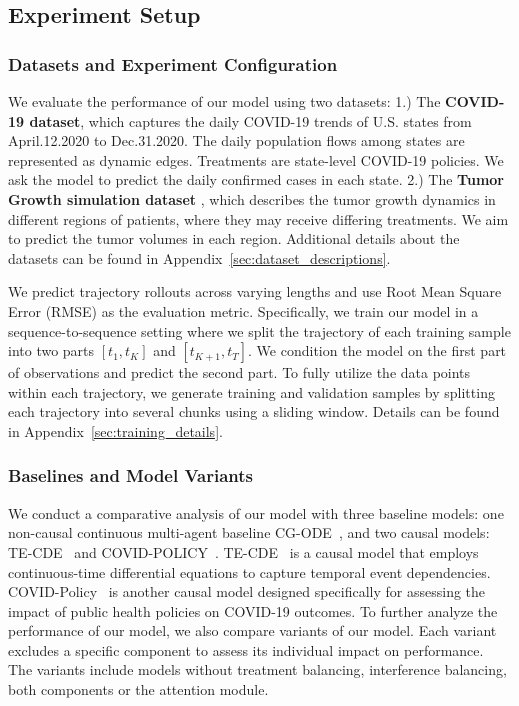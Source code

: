 \subsection{Experiment Setup}
\subsubsection{Datasets and Experiment Configuration} 

We evaluate the performance of our model using two datasets: 1.) The {\bf COVID-19 dataset}, which captures the daily COVID-19 trends of  U.S. states from April.12.2020 to Dec.31.2020. The daily population flows among states are represented as dynamic edges. Treatments are state-level COVID-19 policies. We ask the model to predict the daily confirmed cases in each state.  2.) The {\bf Tumor Growth simulation dataset} \cite{geng2017prediction}, which describes the tumor growth dynamics in different regions of patients, where they may receive differing treatments. We aim to predict the tumor volumes in each region. Additional details about the datasets can be found in Appendix~\ref{sec:dataset_descriptions}.


We predict trajectory rollouts across varying lengths and use Root Mean Square Error (RMSE) as the evaluation metric. Specifically, we train our model in a sequence-to-sequence setting where we split the trajectory of each training sample into two parts $[t_1,t_K]$ and $[t_{K+1},t_T]$. We condition the model on the first part of observations and predict the second part. To fully utilize the data points within each trajectory, we generate training and validation samples by splitting each trajectory into several chunks using a sliding window. Details can be found in Appendix~\ref{sec:training_details}.


\subsubsection{Baselines and Model Variants}
We conduct a comparative analysis of our model with three baseline models:  one non-causal continuous multi-agent baseline CG-ODE~\cite{huang2021coupled}, and two causal models: TE-CDE~\cite{seedat2022continuous} and COVID-POLICY~\cite{covidpolicy}. TE-CDE~\cite{seedat2022continuous} is a causal model that employs continuous-time differential equations to capture temporal event dependencies. COVID-Policy~\cite{covidpolicy} is another causal model designed specifically for assessing the impact of public health policies on COVID-19 outcomes. To further analyze the performance of our model, we also compare variants of our model. Each variant excludes a specific component to assess its individual impact on performance. The variants include models without treatment balancing, interference balancing, both components or the attention module.

